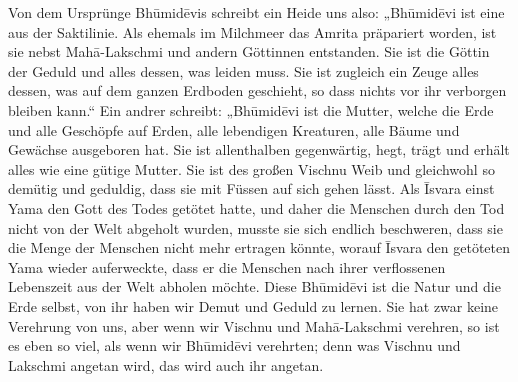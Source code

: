 \documentclass{article}
\begin{document}
Von dem Ursprünge Bh\={u}mid\={e}vis schreibt ein Heide uns also: „Bh\={u}mid\={e}vi ist eine aus der Saktilinie. Als ehemals im Milchmeer das Amrita präpariert worden, ist sie nebst Mah\={a}-Lakschmi und andern Göttinnen entstanden. Sie ist die Göttin der Geduld und alles dessen, was leiden muss. Sie ist zugleich ein Zeuge alles dessen, was auf dem ganzen Erdboden geschieht, so dass nichts vor ihr verborgen bleiben kann.“ Ein andrer schreibt: „Bh\={u}mid\={e}vi ist die Mutter, welche die Erde und alle Geschöpfe auf Erden, alle lebendigen Kreaturen, alle Bäume und Gewächse ausgeboren hat. Sie ist allenthalben gegenwärtig, hegt, trägt und erhält alles wie eine gütige Mutter. Sie ist des großen Vischnu Weib und gleichwohl so demütig und geduldig, dass sie mit Füssen auf sich gehen lässt. Als \={I}svara einst Yama den Gott des Todes getötet hatte, und daher die Menschen durch den Tod nicht von der Welt abgeholt wurden, musste sie sich endlich beschweren, dass sie die Menge der Menschen nicht mehr ertragen könnte, worauf \={I}svara den getöteten Yama wieder auferweckte, dass er die Menschen nach ihrer verflossenen Lebenszeit aus der Welt abholen möchte. Diese Bh\={u}mid\={e}vi ist die Natur und die Erde selbst, von ihr haben wir Demut und Geduld zu lernen. Sie hat zwar keine Verehrung von uns, aber wenn wir Vischnu und Mah\={a}-Lakschmi verehren, so ist es eben so viel, als wenn wir Bh\={u}mid\={e}vi verehrten; denn was Vischnu und Lakschmi angetan wird, das wird auch ihr angetan.

\begin{center}
\end{center}
\end{document}
